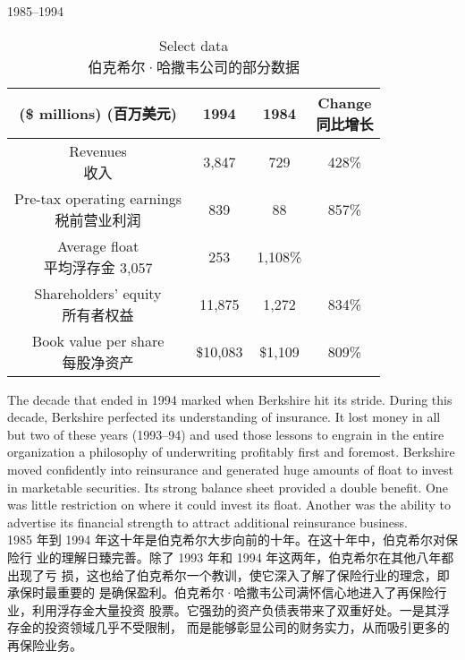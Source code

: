 \begin{section}{1985--1994}

\begin{table}[!htbp]
  \centering
  \begin{center}
    \begin{tabular}{cccc}
      \toprule
      \makecell[c]{(\$ millions) \\ (百万美元)} & 1994 & 1984 & \makecell[c]{Change \\ 同比增长} \\
      \midrule
      \makecell[c]{Revenues \\ 收入} & 3,847 & 729 & 428\% \\
      \makecell[c]{Pre-tax operating earnings \\ 税前营业利润} & 839 & 88 & 857\% \\
      \makecell[c]{Average float \\ 平均浮存金} 3,057 & 253 & 1,108\% \\
      \makecell[c]{Shareholders' equity \\ 所有者权益} & 11,875 & 1,272 & 834\% \\
      \makecell[c]{Book value per share \\ 每股净资产} & \$10,083 & \$1,109 & 809\% \\
      \bottomrule
    \end{tabular}
    \caption{Select data \\ 伯克希尔·哈撒韦公司的部分数据}
  \end{center}
\end{table}

\begin{verseparallel}
  {
    The decade that ended in 1994 marked when Berkshire hit its stride. During
    this decade, Berkshire perfected its understanding of insurance. It lost
    money in all but two of these years (1993--94) and used those lessons to
    engrain in the entire organization a philosophy of underwriting profitably
    first and foremost. Berkshire moved confidently into reinsurance and
    generated huge amounts of float to invest in marketable securities. Its
    strong balance sheet provided a double benefit. One was little restriction
    on where it could invest its float. Another was the ability to advertise its
    financial strength to attract additional reinsurance business. \\
  }
  {
    1985 年到 1994 年这十年是伯克希尔大步向前的十年。在这十年中，伯克希尔对保险行
    业的理解日臻完善。除了 1993 年和 1994 年这两年，伯克希尔在其他八年都出现了亏
    损，这也给了伯克希尔一个教训，使它深入了解了保险行业的理念，即承保时最重要的
    是确保盈利。伯克希尔·哈撒韦公司满怀信心地进入了再保险行业，利用浮存金大量投资
    股票。它强劲的资产负债表带来了双重好处。一是其浮存金的投资领域几乎不受限制，
    而是能够彰显公司的财务实力，从而吸引更多的再保险业务。
  }
\end{verseparallel}


\end{section}
